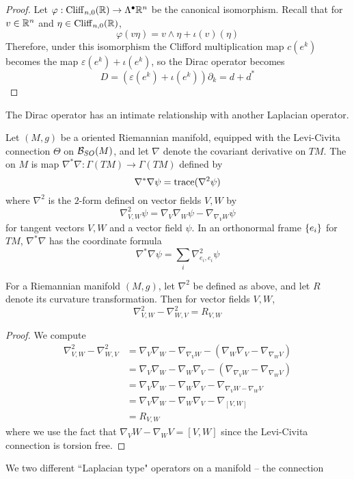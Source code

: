 %
\begin{proof}
Let $\varphi : \operatorname{Cliff}_{n,0}(\mathbb{R}) \to \Lambda^\bullet \mathbb{R}^n$ be the canonical isomorphism.
Recall that for $v \in \mathbb{R}^n$ and $\eta \in \operatorname{Cliff}_{n,0}(\mathbb{R})$,
\[
\varphi(v\eta) = v \wedge \eta + \iota(v)(\eta)
\]
Therefore, under this isomorphism the Clifford multiplication map $c(e^k)$ becomes
the map $\varepsilon(e^k) + \iota(e^k)$, so the Dirac operator becomes
\[
D = (\varepsilon(e^k) + \iota(e^k))\partial_k = d + d^*
\]
\end{proof}
%
The Dirac operator has an intimate relationship with another Laplacian operator.
\begin{defn}
Let $(M,g)$ be a oriented Riemannian manifold, equipped with the Levi-Civita connection
$\Theta$ on $\mathcal{B}_{SO}(M)$, and let $\nabla$ denote the covariant derivative on $TM$.
The  on $M$ is map $\nabla^*\nabla : \Gamma(TM) \to \Gamma(TM)$
defined by
\[
\nabla^*\nabla\psi = \operatorname{trace}(\nabla^2\psi)
\]
where $\nabla^2$ is the $2$-form defined on vector fields $V,W$ by
\[
\nabla^2_{V,W}\psi = \nabla_V\nabla_W\psi - \nabla_{\nabla_VW}\psi
\]
for tangent vectors $V,W$ and a vector field $\psi$. In an orthonormal frame $\left\lbrace e_i \right\rbrace$
for $TM$, $\nabla^*\nabla$ has the coordinate formula
\[
\nabla^*\nabla\psi = \sum_i \nabla^2_{e_i, e_i}\psi
\]
\end{defn}
%
\begin{lem}
For a Riemannian manifold $(M,g)$, let $\nabla^2$ be defined as above, and let $R$
denote its curvature transformation. Then for vector fields $V,W$,
\[
\nabla^2_{V,W} - \nabla^2_{W,V} = R_{V,W}
\]
\end{lem}
%
\begin{proof}
We compute
\begin{align*}
\nabla^2_{V,W} - \nabla^2_{W,V} &= \nabla_V\nabla_W - \nabla_{\nabla_VW}
- (\nabla_W\nabla_V - \nabla_{\nabla_W V}) \\
&= \nabla_V\nabla_W - \nabla_W\nabla_V - (\nabla_{\nabla_VW} - \nabla_{\nabla_WV}) \\
&= \nabla_V\nabla_W - \nabla_W\nabla_V - \nabla_{\nabla_VW - \nabla_WV} \\
&= \nabla_V\nabla_W - \nabla_W\nabla_V - \nabla_{[V,W]} \\
&= R_{V,W}
\end{align*}
where we use the fact that $\nabla_VW - \nabla_WV = [V,W]$ since the Levi-Civita
connection is torsion free.
\end{proof}
%
We two different ``Laplacian type" operators on a manifold -- the connection
